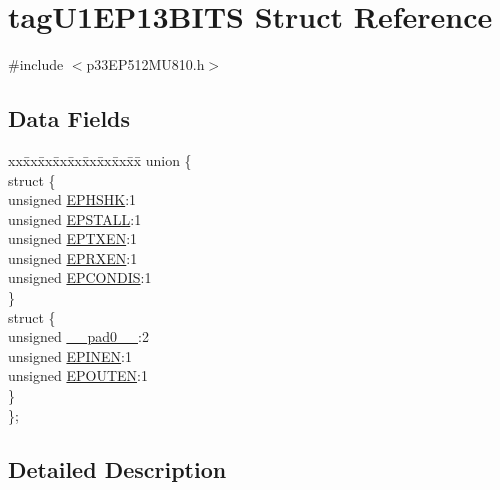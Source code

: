 \hypertarget{structtag_u1_e_p13_b_i_t_s}{}\section{tag\+U1\+E\+P13\+B\+I\+TS Struct Reference}
\label{structtag_u1_e_p13_b_i_t_s}


{\ttfamily \#include $<$p33\+E\+P512\+M\+U810.\+h$>$}

\subsection*{Data Fields}
\begin{DoxyCompactItemize}
\item 
\begin{tabbing}
xx\=xx\=xx\=xx\=xx\=xx\=xx\=xx\=xx\=\kill
union \{\\
\>struct \{\\
\>\>unsigned \hyperlink{structtag_u1_e_p13_b_i_t_s_a0d06430217cb4b189fbe9d0c4b460482}{EPHSHK}:1\\
\>\>unsigned \hyperlink{structtag_u1_e_p13_b_i_t_s_a47042104f04ebe06a23f9789bd400d7e}{EPSTALL}:1\\
\>\>unsigned \hyperlink{structtag_u1_e_p13_b_i_t_s_aa2d88c1be513e759c136823c86a355b4}{EPTXEN}:1\\
\>\>unsigned \hyperlink{structtag_u1_e_p13_b_i_t_s_a8a388d32ceffb87230e660b6793f2857}{EPRXEN}:1\\
\>\>unsigned \hyperlink{structtag_u1_e_p13_b_i_t_s_a1bd26df05d2b5a11b20ee548fce90c3e}{EPCONDIS}:1\\
\>\} \\
\>struct \{\\
\>\>unsigned \hyperlink{structtag_u1_e_p13_b_i_t_s_adf71f3d8410c1f1dbbc96680a92c49af}{\_\_pad0\_\_}:2\\
\>\>unsigned \hyperlink{structtag_u1_e_p13_b_i_t_s_a8b6d98cdf233ac90ff19d16d9a89215e}{EPINEN}:1\\
\>\>unsigned \hyperlink{structtag_u1_e_p13_b_i_t_s_adf87e8acfbb27a5626e21b3e3bd106fd}{EPOUTEN}:1\\
\>\} \\
\}; \\

\end{tabbing}\end{DoxyCompactItemize}


\subsection{Detailed Description}


